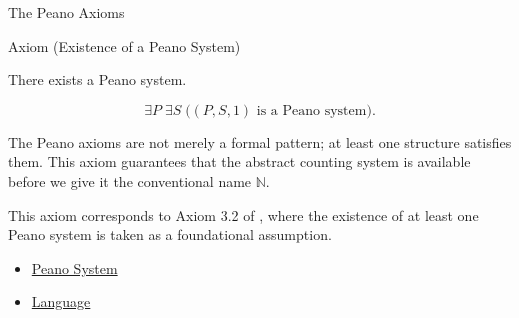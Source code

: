 \begin{topicbox}{The Peano Axioms}
\NoLocalDependencies

\begin{axiombox}{Axiom (Existence of a Peano System)}
\begin{axiom}
\label{ax:peano-system-existence}
There exists a Peano system.
\end{axiom}
\end{axiombox}

\begin{remark*}
\[
\exists P\;\exists S\;\bigl((P,S,1)\text{ is a Peano system}\bigr).
\]
\end{remark*}

\begin{remark*}[Interpretation]
The Peano axioms are not merely a formal pattern; at least one structure
satisfies them. This axiom guarantees that the abstract counting system is
available before we give it the conventional name $\mathbb{N}$.
\end{remark*}

\begin{remark*}
This axiom corresponds to Axiom 3.2 of
\citet{FefermanNumberSystems1964}, where the existence of at least one Peano
system is taken as a foundational assumption.
\end{remark*}

\begin{dependencies}
\begin{itemize}
  \item \hyperref[def:peano-system]{Peano System}
  \item \hyperref[def:language]{Language}
\end{itemize}
\end{dependencies}
\end{topicbox}
